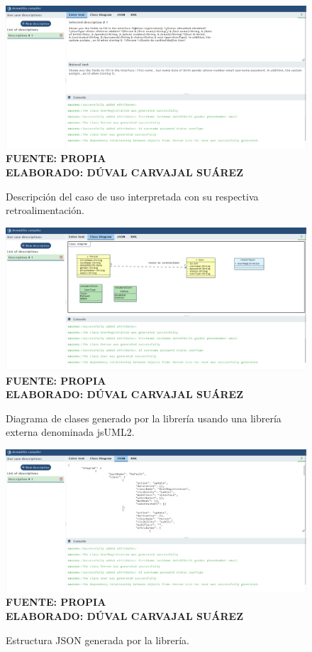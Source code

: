\begin{figure}[H]
	\caption{Descripción del caso de uso interpretada con su respectiva retroalimentación.}
	\includegraphics[width=15cm]{img/anexo3.png}
	\label{fig:anexo3}
	\textbf{\\ FUENTE: PROPIA \\ ELABORADO: DÚVAL CARVAJAL SUÁREZ}
\end{figure} 

\begin{figure}[H]
	\caption{Diagrama de clases generado por la librería usando una librería externa denominada jsUML2.}
	\includegraphics[width=15cm]{img/anexo4.png}
	\label{fig:anexo4}
	\textbf{\\ FUENTE: PROPIA \\ ELABORADO: DÚVAL CARVAJAL SUÁREZ}
\end{figure} 

\begin{figure}[H]
	\caption{Estructura JSON generada por la librería.}
	\includegraphics[width=15cm]{img/anexo5.png}
	\label{fig:anexo5}
	\textbf{\\ FUENTE: PROPIA \\ ELABORADO: DÚVAL CARVAJAL SUÁREZ}
\end{figure} 

